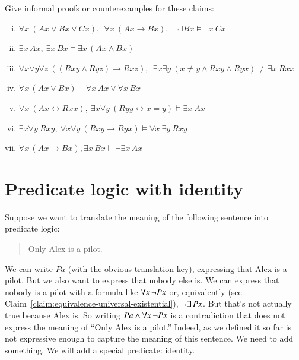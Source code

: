 \documentclass[nobib,nofonts]{tufte-handout}
\newcommand{\predlog}{\acro{PredLog}}
\begin{document}
{\begin{minipage}{1.0\textwidth}
    \begin{exercise}
      Give informal proofs or counterexamples for these claims:
        \begin{enumerate}[(i)]
          \item $\forall x \ (Ax \vee Bx \vee Cx), \ \ \forall x \ (Ax \rightarrow Bx), \ \ \neg \exists Bx \models \exists x \ Cx$
          \item $\exists x \, Ax, \ \exists x \, Bx \models \exists x \, (Ax \wedge Bx)$
          \item $\forall x \forall y \forall z \ ((Rxy \wedge Ryz) \rightarrow
          Rxz), \ \ \exists x \exists y \ (x \neq y \wedge Rxy \wedge Ryx) \
          \ / \ \ \exists x \ Rxx$
          \item $\forall x \, (Ax \vee Bx) \models \forall x \, Ax \vee \forall x \, Bx$
          \item $\forall x \ (Ax \leftrightarrow Rxx), \ \exists x \forall y \
          (Ryy \leftrightarrow x=y) \models \exists x \ Ax$
          \item $\exists x \forall y \ Rxy, \ \forall x \forall y \ (Rxy
          \rightarrow Ryx) \models \forall x \ \exists y \ Rxy$
          \item $\forall x \, (Ax \rightarrow Bx),  \exists x \, Bx \models  \neg \exists x \, Ax$
        \end{enumerate}

    \end{exercise}

  \end{minipage}
}

\newpage

\section{Predicate logic with identity}
\label{sec:predicate-logic-with}

Suppose we want to translate the meaning of the following sentence into predicate logic:
\begin{quote}
  Only Alex is a pilot.
\end{quote}
We can write $Pa$ (with the obvious translation key), expressing that Alex is a pilot.
But we also want to express that nobody else is.
We can express that nobody is a pilot with a formula like $\forall x \thinspace \neg Px$ or, equivalently (see Claim~\ref{claim:equivalence-universal-existential}), $\neg \exists \thinspace Px$.
But that's not actually true because Alex is.
So writing $Pa \wedge \forall x \thinspace \neg Px$ is a contradiction that does not express the meaning of ``Only Alex is a pilot.''
Indeed, \predlog as we defined it so far is not expressive enough to capture the meaning of this sentence.
We need to add something.
We will add a special predicate: identity.
\end{document}
